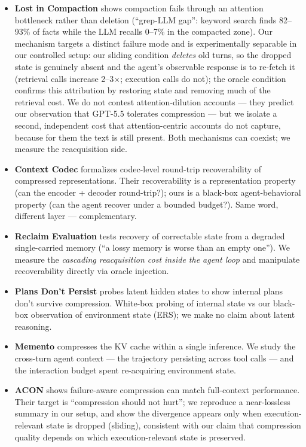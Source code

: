\documentclass[11pt]{article}
\begin{document}
\begin{itemize}
\item \textbf{Lost in Compaction} shows compaction fails through an attention bottleneck rather
  than deletion (``grep-LLM gap'': keyword search finds 82--93\% of facts while the LLM
  recalls 0--7\% in the compacted zone). Our mechanism targets a distinct failure mode and
  is experimentally separable in our controlled setup: our sliding condition \emph{deletes}
  old turns, so the dropped state is genuinely absent and the agent's observable response
  is to re-fetch it (retrieval calls increase 2--3$\times$; execution calls do not); the oracle
  condition confirms this attribution by restoring state and removing much of the
  retrieval cost. We do not contest attention-dilution accounts --- they predict our
  observation that GPT-5.5 tolerates compression --- but we isolate a second, independent
  cost that attention-centric accounts do not capture, because for them the text is still
  present. Both mechanisms can coexist; we measure the reacquisition side.

\item \textbf{Context Codec} formalizes codec-level round-trip recoverability of compressed
  representations. Their recoverability is a representation property (can the encoder +
  decoder round-trip?); ours is a black-box agent-behavioral property (can the agent
  recover under a bounded budget?). Same word, different layer --- complementary.

\item \textbf{Reclaim Evaluation} tests recovery of correctable state from a degraded single-carried
  memory (``a lossy memory is worse than an empty one''). We measure the \emph{cascading reacquisition cost
  inside the agent loop} and manipulate recoverability directly via oracle injection.

\item \textbf{Plans Don't Persist} probes latent hidden states to show internal plans don't
  survive compression. White-box probing of internal state vs our black-box observation
  of environment state (ERS); we make no claim about latent reasoning.

\item \textbf{Memento} compresses the KV cache within a single inference. We study the cross-turn
  agent context --- the trajectory persisting across tool calls --- and the interaction
  budget spent re-acquiring environment state.

\item \textbf{ACON} shows failure-aware compression can match full-context performance. Their
  target is ``compression should not hurt''; we reproduce a near-lossless summary in our
  setup, and show the divergence appears only when execution-relevant state is dropped
  (sliding), consistent with our claim that compression quality depends on which
  execution-relevant state is preserved.


\end{itemize}
\end{document}
